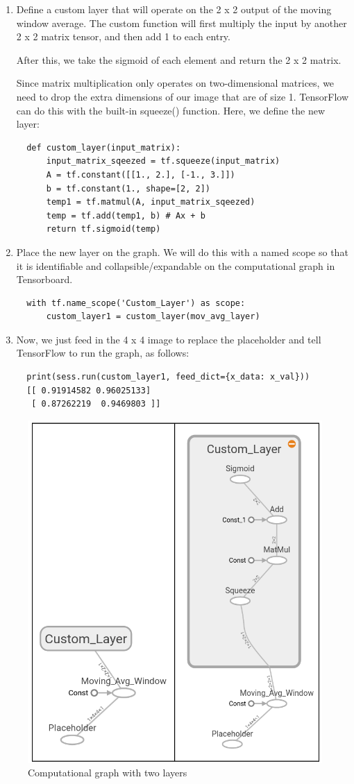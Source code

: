 \documentclass[twoside]{article}
\begin{document}
\begin{enumerate}
  \item Define a custom layer that will operate on the 2 x 2 output of the moving window average. The custom function will first multiply the input by another 2 x 2 matrix tensor, and then add 1 to each entry.

  After this, we take the sigmoid of each element and return the 2 x 2 matrix.

  Since matrix multiplication only operates on two-dimensional matrices, we need to drop the extra dimensions of our image that are of size 1. TensorFlow can do this with the built-in squeeze() function. Here, we define the new layer:
  \begin{lstlisting}
  def custom_layer(input_matrix):
      input_matrix_sqeezed = tf.squeeze(input_matrix)
      A = tf.constant([[1., 2.], [-1., 3.]])
      b = tf.constant(1., shape=[2, 2])
      temp1 = tf.matmul(A, input_matrix_sqeezed)
      temp = tf.add(temp1, b) # Ax + b
      return tf.sigmoid(temp)
  \end{lstlisting}

  \item Place the new layer on the graph. We will do this with a named scope so that it is identifiable and collapsible/expandable on the computational graph in Tensorboard.
  \begin{lstlisting}
  with tf.name_scope('Custom_Layer') as scope:
      custom_layer1 = custom_layer(mov_avg_layer)
  \end{lstlisting}

  \item Now, we just feed in the 4 x 4 image to replace the placeholder and tell TensorFlow to run the graph, as follows:
  \begin{lstlisting}
  print(sess.run(custom_layer1, feed_dict={x_data: x_val}))
  [[ 0.91914582 0.96025133]
   [ 0.87262219  0.9469803 ]]
  \end{lstlisting}

\end{enumerate}

\begin{figure}[H]
  \centering
  \includegraphics[width=0.8 \linewidth]{images/03_Multiple_Layers.png}
  \caption{Computational graph with two layers}
\end{figure}
\end{document}
